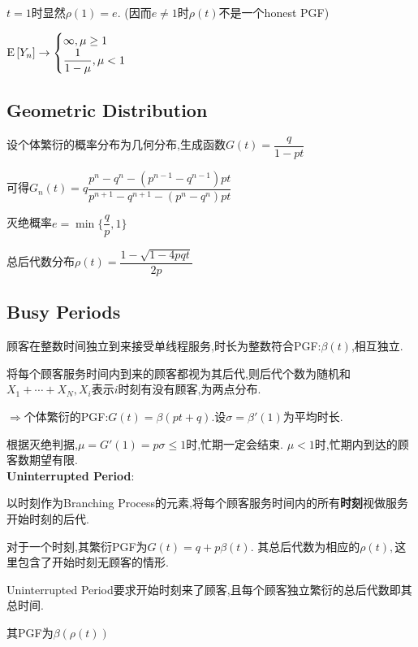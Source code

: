$ t = 1时显然\rho(1) = e.$ (因而$ e \ne 1$时$ \rho(t)$不是一个honest PGF)

$\text{E}\left[Y_n\right] \to \begin{cases}\infty, \mu \ge  1\\\dfrac{1}{1-\mu}, \mu < 1\end{cases} $

\subsection{Geometric Distribution}
设个体繁衍的概率分布为几何分布,生成函数$ G(t) = \dfrac{q}{1-pt}$

可得$ G_n(t) = q\dfrac{p^n-q^n - (p^{n-1}-q^{n-1})pt}{p^{n+1}-q^{n+1}-(p^n-q^n)pt}$

灭绝概率$ e = \min\{\dfrac{q}{p},1\}$

总后代数分布$ \rho(t) = \dfrac{1-\sqrt{1-4pqt}}{2p}$

\subsection{Busy Periods}
顾客在整数时间独立到来接受单线程服务,时长为整数符合PGF:$ \beta(t)$,相互独立.

将每个顾客服务时间内到来的顾客都视为其后代,则后代个数为随机和$ X_1 + \cdots +X_N, X_i $表示$ i$时刻有没有顾客,为两点分布.

$ \Rightarrow $个体繁衍的PGF:$ G(t)= \beta(pt + q). $设$ \sigma = \beta'(1)$为平均时长.

根据灭绝判据,$ \mu = G'(1) = p\sigma \le 1$时,忙期一定会结束. $ \mu < 1$时,忙期内到达的顾客数期望有限.
\\

\textbf{Uninterrupted Period}:

以时刻作为Branching Process的元素,将每个顾客服务时间内的所有\textbf{时刻}视做服务开始时刻的后代.

对于一个时刻,其繁衍PGF为$ G(t) = q + p\beta(t)$. 其总后代数为相应的$ \rho(t),$这里包含了开始时刻无顾客的情形.

Uninterrupted Period要求开始时刻来了顾客,且每个顾客独立繁衍的总后代数即其总时间.

其PGF为$ \beta(\rho(t))$
